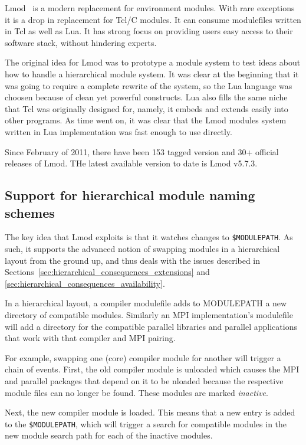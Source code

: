 Lmod~\cite{laytonLmod,taccSecretSauce,taccLmod} is a modern
replacement for environment modules.  With rare exceptions it is a
drop in replacement for Tcl/C modules. It can consume modulefiles
written in Tcl as well as Lua\cite{LuaBook}.  It has strong focus on
providing users easy access to their software stack, without hindering
experts.

The original idea for Lmod was to prototype a module system to test
ideas about how to handle a hierarchical module system.  It was clear
at the beginning that it was going to require a complete rewrite of
the system, so the Lua language was choosen because of clean yet
powerful constructs.  Lua also fills the same niche that Tcl was
originally designed for, namely, it embeds and extends easily into
other programs.  As time went on, it was clear that the Lmod modules
system written in Lua implementation was fast enough to use directly.

Since February of 2011, there have been 153 tagged version and 30+ official
releases of Lmod. THe latest available version to date is Lmod v5.7.3.

\subsection{Support for hierarchical module naming schemes}

The key idea that Lmod exploits is that it watches changes to
\texttt{\$MODULEPATH}. As such, it supports the advanced notion of
swapping modules in a hierarchical layout from the ground up, and thus
deals with the issues described in
Sections~\ref{sec:hierarchical_consequences_extensions} and
\ref{sec:hierarchical_consequences_availability}.

In a hierarchical layout, a compiler modulefile adds to
MODULEPATH a new directory of compatible modules.  Similarly an MPI
implementation's modulefile will add a directory for the compatible
parallel libraries and parallel applications that work with that
compiler and MPI pairing.

For example, swapping one (core) compiler module for another will trigger
a chain of events.  First, the old compiler module is unloaded
which causes the MPI and parallel packages that depend on it to be
nloaded because the respective module files can no longer be found.
These modules are marked \emph{inactive}.

Next, the new compiler module is loaded.  This means that a new entry
is added to the \texttt{\$MODULEPATH}, which will trigger a search
for compatible modules in the new module search path for each of the
inactive modules.

